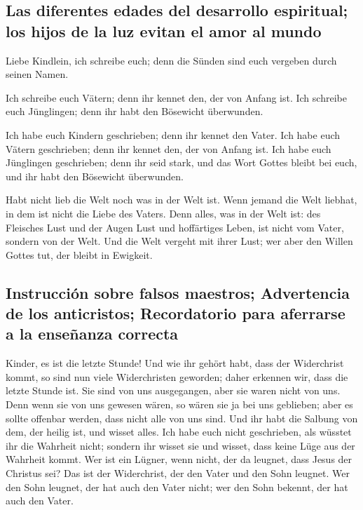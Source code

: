 \hypertarget{las-diferentes-edades-del-desarrollo-espiritual-los-hijos-de-la-luz-evitan-el-amor-al-mundo}{%
\subsection{Las diferentes edades del desarrollo espiritual; los hijos
de la luz evitan el amor al
mundo}\label{las-diferentes-edades-del-desarrollo-espiritual-los-hijos-de-la-luz-evitan-el-amor-al-mundo}}

 Liebe Kindlein, ich schreibe euch; denn die Sünden sind
euch vergeben durch seinen Namen.

 Ich schreibe euch Vätern; denn ihr kennet den, der von
Anfang ist. Ich schreibe euch Jünglingen; denn ihr habt den Bösewicht
überwunden.

 Ich habe euch Kindern geschrieben; denn ihr kennet den
Vater. Ich habe euch Vätern geschrieben; denn ihr kennet den, der von
Anfang ist. Ich habe euch Jünglingen geschrieben; denn ihr seid stark,
und das Wort Gottes bleibt bei euch, und ihr habt den Bösewicht
überwunden.

 Habt nicht lieb die Welt noch was in der Welt ist. Wenn
jemand die Welt liebhat, in dem ist nicht die Liebe des Vaters.
 Denn alles, was in der Welt ist: des Fleisches Lust und
der Augen Lust und hoffärtiges Leben, ist nicht vom Vater, sondern von
der Welt.  Und die Welt vergeht mit ihrer Lust; wer aber
den Willen Gottes tut, der bleibt in Ewigkeit.

\hypertarget{instrucciuxf3n-sobre-falsos-maestros-advertencia-de-los-anticristos-recordatorio-para-aferrarse-a-la-enseuxf1anza-correcta}{%
\subsection{Instrucción sobre falsos maestros; Advertencia de los
anticristos; Recordatorio para aferrarse a la enseñanza
correcta}\label{instrucciuxf3n-sobre-falsos-maestros-advertencia-de-los-anticristos-recordatorio-para-aferrarse-a-la-enseuxf1anza-correcta}}

 Kinder, es ist die letzte Stunde! Und wie ihr gehört
habt, dass der Widerchrist kommt, so sind nun viele Widerchristen
geworden; daher erkennen wir, dass die letzte Stunde ist.
 Sie sind von uns ausgegangen, aber sie waren nicht von
uns. Denn wenn sie von uns gewesen wären, so wären sie ja bei uns
geblieben; aber es sollte offenbar werden, dass nicht alle von uns sind.
 Und ihr habt die Salbung von dem, der heilig ist, und
wisset alles.  Ich habe euch nicht geschrieben, als
wüsstet ihr die Wahrheit nicht; sondern ihr wisset sie und wisset, dass
keine Lüge aus der Wahrheit kommt.  Wer ist ein Lügner,
wenn nicht, der da leugnet, dass Jesus der Christus sei? Das ist der
Widerchrist, der den Vater und den Sohn leugnet.  Wer den
Sohn leugnet, der hat auch den Vater nicht; wer den Sohn bekennt, der
hat auch den Vater.

